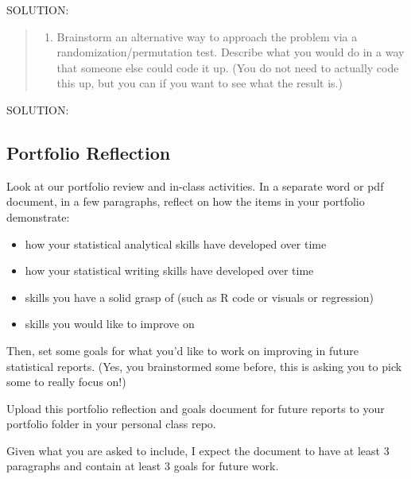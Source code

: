 \documentclass[
]{article}
\providecommand{\tightlist}{%
  \setlength{\itemsep}{0pt}\setlength{\parskip}{0pt}}
\begin{document}
SOLUTION:

\begin{quote}
\begin{enumerate}
\def\labelenumi{(\alph{enumi})}
\setcounter{enumi}{4}
\tightlist
\item
  Brainstorm an alternative way to approach the problem via a
  randomization/permutation test. Describe what you would do in a way
  that someone else could code it up. (You do not need to actually code
  this up, but you can if you want to see what the result is.)
\end{enumerate}
\end{quote}

SOLUTION:

\newpage

\hypertarget{portfolio-reflection}{%
\subsection{Portfolio Reflection}\label{portfolio-reflection}}

Look at our portfolio review and in-class activities. In a separate word
or pdf document, in a few paragraphs, reflect on how the items in your
portfolio demonstrate:

\begin{itemize}
\tightlist
\item
  how your statistical analytical skills have developed over time
\item
  how your statistical writing skills have developed over time
\item
  skills you have a solid grasp of (such as R code or visuals or
  regression)
\item
  skills you would like to improve on
\end{itemize}

Then, set some goals for what you'd like to work on improving in future
statistical reports. (Yes, you brainstormed some before, this is asking
you to pick some to really focus on!)

Upload this portfolio reflection and goals document for future reports
to your portfolio folder in your personal class repo.

Given what you are asked to include, I expect the document to have at
least 3 paragraphs and contain at least 3 goals for future work.
\end{document}
